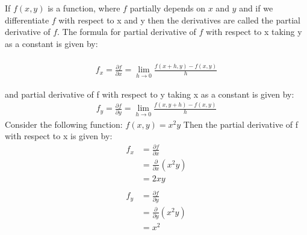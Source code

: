 \documentclass[a4paper]{article}
\begin{document}
If $f(x, y)$ is a function, where $f$ partially depends on $x$ and $y$ and if we diﬀerentiate $f$ with respect to x and y then the derivatives are called the partial derivative of $f$. The formula for partial derivative of $f$ with respect to x taking y as a constant is given by:\\\\
\begin{align*}
    f_x = \frac{\partial f}{\partial x} = \lim_{{h \to 0}} \frac{f(x+h, y) - f(x, y)}{h}
\end{align*}

and partial derivative of f with respect to y taking x as a constant is given by:\newline\\
\begin{align*}
    f_y = \frac{\partial f}{\partial y} = \lim_{{h \to 0}} \frac{f(x, y+h) - f(x, y)}{h}
\end{align*}
Consider the following function: $f(x,y)=x^2y$ Then the partial derivative of f with respect to x is given by:\newline\\
\begin{align*}
    f_x & = \frac{\partial f}{\partial x}      \\
        & = \frac{\partial}{\partial x} (x^2y) \\
        & = 2xy                                \\
    \\
    f_y & = \frac{\partial f}{\partial y}      \\
        & = \frac{\partial}{\partial y} (x^2y) \\
        & = x^2                                \\
\end{align*}
\end{document}
